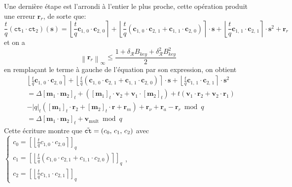 \documentclass[11pt, headsepline, a4paper, fleqn, oneside]{article}
\begin{document}
Une dernière étape est l'arrondi à l'entier le plus proche, cette opération produit une erreur $\boldsymbol{r}_{r}$, de sorte que:
$$\frac{t}{q}\left(\texttt{ct}_{1} \cdot \texttt{ct}_{2}\right)(\boldsymbol{s}) = \left\lfloor\frac{t}{q} \boldsymbol{c}_{1,\,0} \cdot \boldsymbol{c}_{2,\,0}\right\rceil+\left\lfloor\frac{t}{q}\left(\boldsymbol{c}_{1,\,0} \cdot \boldsymbol{c}_{2,\,1}+\boldsymbol{c}_{1,\,1} \cdot \boldsymbol{c}_{2,\,0}\right)\right\rceil \cdot \boldsymbol{s}+\left\lfloor\frac{t}{q} \boldsymbol{c}_{1,\,1} \cdot \boldsymbol{c}_{2,\,1}\right\rceil \cdot \boldsymbol{s}^{2}+\boldsymbol{r}_{r}$$
et on a \begin{equation}
    \left\|\boldsymbol{r}_{r}\right\|_{\infty} \leq \frac{1+\delta_{\mathcal{R}} B_{key}+\delta_{\mathcal{R}}^{2} B_{key}^{2}}{2}
\end{equation}
en remplaçant le terme à gauche de l'équation par son expression, on obtient 
$$\begin{aligned}
&\left\lfloor\frac{t}{q} \boldsymbol{c}_{1,\,0} \cdot \boldsymbol{c}_{2,\,0}\right\rceil+\left\lfloor\frac{t}{q}\left(\boldsymbol{c}_{1,\,0} \cdot \boldsymbol{c}_{2,\,1}+\boldsymbol{c}_{1,\,1} \cdot \boldsymbol{c}_{2,\,0}\right)\right\rceil \cdot \boldsymbol{s}+\left\lfloor\frac{t}{q} \boldsymbol{c}_{1,\,1} \cdot \boldsymbol{c}_{2,\,1}\right\rceil \cdot \boldsymbol{s}^{2} \\ &= \Delta\left[\boldsymbol{m}_{1} \cdot \boldsymbol{m}_{2}\right]_{t}+\left([\boldsymbol{m}_{1}]_{t} \cdot \boldsymbol{v}_{2}+\boldsymbol{v}_{1} \cdot\left[\boldsymbol{m}_{2}\right]_{t}\right)+t\left(\boldsymbol{v}_{1} \cdot \boldsymbol{r}_{2}+\boldsymbol{v}_{2} \cdot \boldsymbol{r}_{1}\right)\\& -|q|_{t}\left([\boldsymbol{m}_{1}]_{t} \cdot \boldsymbol{r}_{2}+\left[\boldsymbol{m}_{2}\right]_{t} \cdot \boldsymbol{r}+\boldsymbol{r}_{m}\right)+\boldsymbol{r}_{\nu}+\boldsymbol{r}_{a}-\boldsymbol{r}_{r} \bmod q \\&= \Delta\left[\boldsymbol{m}_{1} \cdot \boldsymbol{m}_{2}\right]_{t}+\boldsymbol{v}_{\mathrm{mult}} \bmod q
\end{aligned}$$
Cette écriture montre que $\Tilde{\texttt{ct}} = (c_0 ,\, c_1 ,\, c_2 )$ avec $\left\{\begin{array}{l}{c_{0}=\left[\left\lfloor\frac{t}{q} c_{1,0} \cdot c_{2,0}\right\rceil\right]_{q}} \\ {c_{1}=\left[\left\lfloor \frac{t}{q} \left(c_{1,0} \cdot c_{2,1}+c_{1,1} \cdot c_{2,0}\right)\right\rceil\right ]_{q}} \\ {c_{2}=\left[\left\lfloor\frac{t}{q}  c_{1,1} \cdot c_{2,1}\right\rceil\right]_{q}}\end{array}\right.$,
\end{document}
